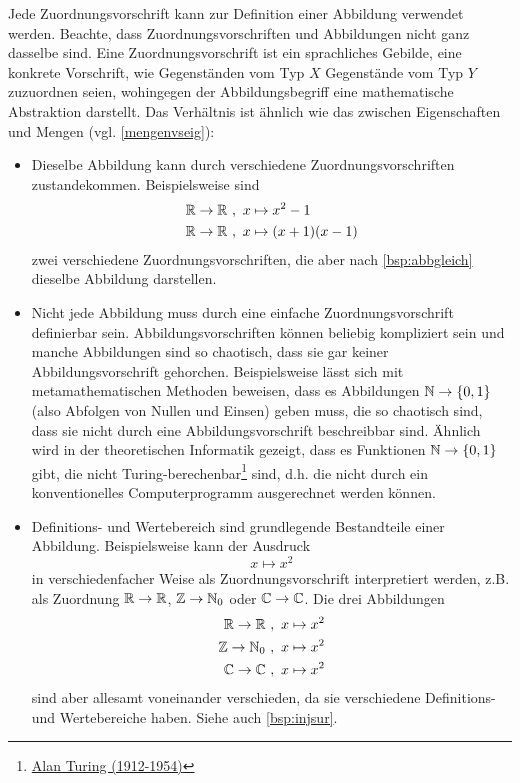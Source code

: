 \begin{bem} \label{zuordvsabb}
    Jede Zuordnungsvorschrift kann zur Definition einer Abbildung verwendet werden. Beachte, dass Zuordnungsvorschriften und Abbildungen nicht ganz dasselbe sind. Eine Zuordnungsvorschrift ist ein sprachliches Gebilde, eine konkrete Vorschrift, wie Gegenständen vom Typ $X$ Gegenstände vom Typ $Y$ zuzuordnen seien, wohingegen der Abbildungsbegriff eine mathematische Abstraktion darstellt. Das Verhältnis ist ähnlich wie das zwischen Eigenschaften und Mengen (vgl. \cref{mengenvseig}):
    \begin{itemize}
        \item Dieselbe Abbildung kann durch verschiedene Zuordnungsvorschriften zustandekommen. Beispielsweise sind
        \begin{align*}
            \mathbb R \to \mathbb R \ &,\ x\mapsto x^2-1 \\
            \mathbb R \to \mathbb R \ &,\ x\mapsto (x+1)(x-1)
        \end{align*}
        zwei verschiedene Zuordnungsvorschriften, die aber nach \cref{bsp:abbgleich} dieselbe Abbildung darstellen.
        \item Nicht jede Abbildung muss durch eine einfache Zuordnungsvorschrift definierbar sein. Abbildungsvorschriften können beliebig kompliziert sein und manche Abbildungen sind so chaotisch, dass sie gar keiner Abbildungsvorschrift gehorchen. Beispielsweise lässt sich mit metamathematischen Methoden beweisen, dass es Abbildungen $\mathbb N \to \{0,1\}$ (also Abfolgen von Nullen und Einsen) geben muss, die so chaotisch sind, dass sie nicht durch eine Abbildungsvorschrift beschreibbar sind. Ähnlich wird in der theoretischen Informatik gezeigt, dass es Funktionen $\mathbb N\to \{0,1\}$ gibt, die nicht Turing-berechenbar\footnote{\href{https://de.wikipedia.org/wiki/Alan_Turing}{Alan Turing (1912-1954)}} sind, d.h. die nicht durch ein konventionelles Computerprogramm ausgerechnet werden können.
        \item Definitions- und Wertebereich sind grundlegende Bestandteile einer Abbildung. Beispielsweise kann der Ausdruck
            \[ x\mapsto x^2 \]
        in verschiedenfacher Weise als Zuordnungsvorschrift interpretiert werden, z.B. als Zuordnung $\mathbb R\to \mathbb R$, $\mathbb Z\to \mathbb N_0$ oder $\mathbb C\to \mathbb C$. Die drei Abbildungen
        \begin{align*}
            \mathbb R \to \mathbb R \ & ,\ x\mapsto x^2 \\
            \mathbb Z \to \mathbb N_0 \ & ,\ x\mapsto x^2 \\
            \mathbb C \to \mathbb C \ &,\ x\mapsto x^2 
        \end{align*}
        sind aber allesamt voneinander verschieden, da sie verschiedene Definitions- und Wertebereiche haben. Siehe auch \cref{bsp:injsur}.
    \end{itemize}
\end{bem}



